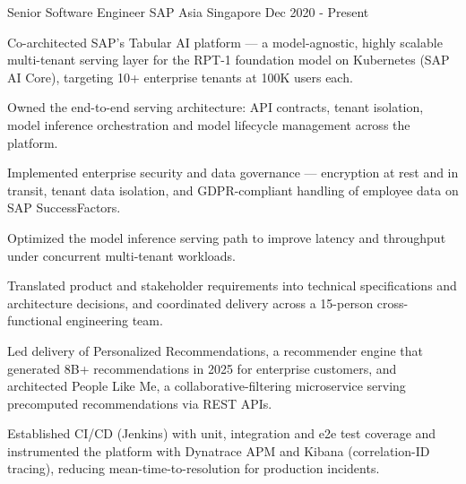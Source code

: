 

\begin{cventries}

  \cventry
    {Senior Software Engineer} %
    {SAP Asia} %
    {Singapore} %
    {Dec 2020 - Present} %
    {
      \begin{cvitems} %
        \item {Co-architected SAP's Tabular AI platform --- a model-agnostic, highly scalable multi-tenant serving layer for the RPT-1 foundation model on Kubernetes (SAP AI Core), targeting 10+ enterprise tenants at 100K users each.}
        \item {Owned the end-to-end serving architecture: API contracts, tenant isolation, model inference orchestration and model lifecycle management across the platform.}
        \item {Implemented enterprise security and data governance --- encryption at rest and in transit, tenant data isolation, and GDPR-compliant handling of employee data on SAP SuccessFactors.}
        \item {Optimized the model inference serving path to improve latency and throughput under concurrent multi-tenant workloads.}
        \item {Translated product and stakeholder requirements into technical specifications and architecture decisions, and coordinated delivery across a 15-person cross-functional engineering team.}
        \item {Led delivery of Personalized Recommendations, a recommender engine that generated 8B+ recommendations in 2025 for enterprise customers, and architected People Like Me, a collaborative-filtering microservice serving precomputed recommendations via REST APIs.}
        \item {Established CI/CD (Jenkins) with unit, integration and e2e test coverage and instrumented the platform with Dynatrace APM and Kibana (correlation-ID tracing), reducing mean-time-to-resolution for production incidents.}
      \end{cvitems}
    }


\end{cventries}
